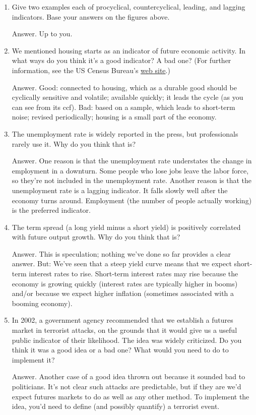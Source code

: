 \documentclass[letterpaper,12pt]{article}
\begin{document}
\begin{enumerate}

\item Give two examples each of procyclical, countercyclical,
leading, and lagging indicators.
Base your answers on the figures above.

Answer.  Up to you.

\item We mentioned housing starts as an indicator
of future economic activity.
In what ways do you think it's a good indicator?  A bad one?
(For further information, see the US Census Bureau's
\href{http://www.census.gov/const/www/newresconstindex.html}
{web site}.)

Answer.  Good:  connected to housing, which as a durable good
should be cyclically sensitive and volatile; available quickly; it
leads the cycle (as you can see from its ccf). Bad: based on a sample,
which leads to short-term noise; revised periodically;
housing is a small part of the economy.

\item The unemployment rate is widely reported in the press,
but professionals rarely use it.  Why do you think that is?

Answer.
One reason is that the unemployment rate understates the
change in employment in a downturn.
Some people who lose jobs leave the labor force,
so they're not included in the unemployment rate.
Another reason is that the unemployment rate is a lagging
indicator.
It falls slowly well after the economy turns around.
Employment (the number of people actually working) is
the preferred indicator.

\item The term spread (a long yield minus a short yield)
is positively correlated with future output growth.  Why do you think that is?

Answer.  This is speculation; nothing we've done so far provides
a clear answer.
But:  We've seen that a steep yield curve means that we expect
short-term interest rates to rise.  Short-term interest rates may
rise because the economy is growing quickly (interest rates are
typically higher in booms) and/or because we expect higher
inflation (sometimes associated with a booming economy).

\item In 2002, a government agency recommended that we establish a
futures market in terrorist attacks, on the grounds that it would
give us a useful public indicator of their likelihood.  The idea
was widely criticized.  Do you think it was a good idea or a bad
one?  What would you need to do to implement it?

Answer.  Another case of a good idea thrown out because it sounded
bad to politicians.  It's not clear such attacks are predictable,
but if they are we'd expect futures markets to do as well as any
other method.  To implement the idea, you'd need to define (and
possibly quantify) a terrorist event.
\end{enumerate}
\end{document}
